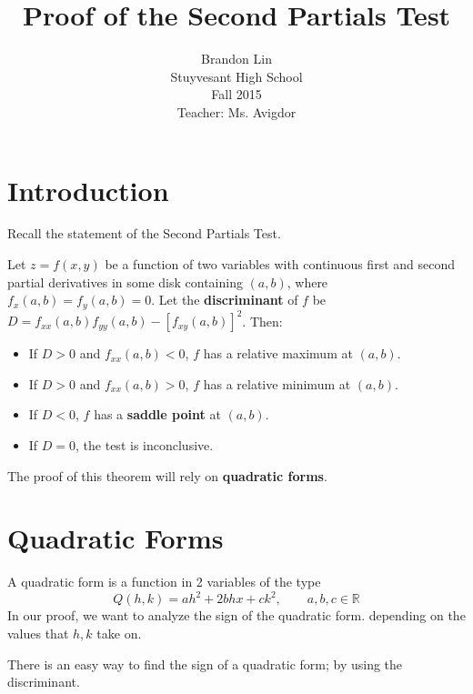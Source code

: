 \documentclass[12pt]{article}
\begin{document}
\title{Proof of the Second Partials Test}
\author{Brandon Lin\\Stuyvesant High School\\Fall 2015\\Teacher: Ms. Avigdor}
\maketitle
\newpage


\tableofcontents
\newpage

\section{Introduction}
Recall the statement of the Second Partials Test.
\begin{theorem}
Let $z = f(x,y)$ be a function of two variables with continuous first and second partial derivatives in some disk containing $(a,b)$, where $f_x(a,b) = f_y(a,b) = 0$. Let the \textbf{discriminant} of $f$ be $D = f_{xx}(a,b)f_{yy}(a,b) - [f_{xy}(a,b)]^2$. Then:
\begin{itemize}
\item If $D > 0$ and $f_{xx}(a,b) < 0$, $f$ has a relative maximum at $(a,b)$.
\item If $D > 0$ and $f_{xx}(a,b) > 0$, $f$ has a relative minimum at $(a,b)$.
\item If $D < 0$, $f$ has a \textbf{saddle point} at $(a,b)$.
\item If $D = 0$, the test is inconclusive.
\end{itemize}
\end{theorem}
The proof of this theorem will rely on \textbf{quadratic forms}.

\section{Quadratic Forms}
A quadratic form is a function in 2 variables of the type \[ Q(h,k) = ah^2 + 2bhx + ck^2, \qquad a,b,c \in \mathbb{R} \] In our proof, we want to analyze the sign of the quadratic form. depending on the values that $h,k$ take on. 

There is an easy way to find the sign of a quadratic form; by using the discriminant.
\end{document}
